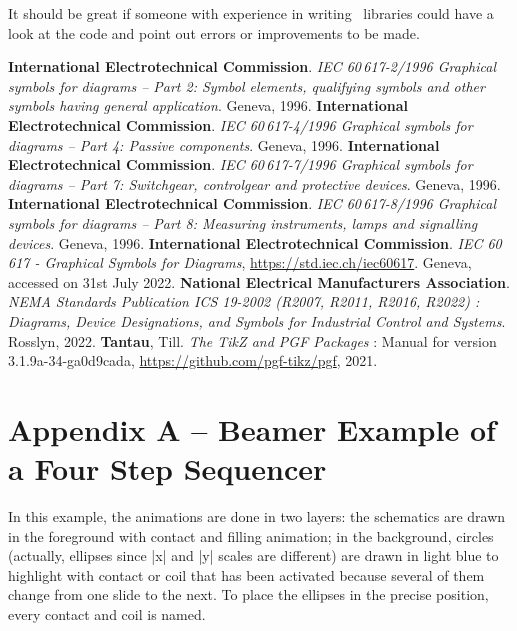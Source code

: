 \documentclass[a4paper]{ltxdoc}
\begin{document}
It should be great if someone with experience in writing \tikzname\ libraries could have a look at the code and point out errors or improvements to be made. 



\begin{thebibliography}{1}

\textbf{International Electrotechnical Commission}. \textit{IEC 60\,617-2/1996 Graphical symbols for diagrams -- Part 2: Symbol elements, qualifying symbols and other symbols having general application}. Geneva, 1996.
\textbf{International Electrotechnical Commission}. \textit{IEC 60\,617-4/1996 Graphical symbols for diagrams -- Part 4: Passive components}. Geneva, 1996.
\textbf{International Electrotechnical Commission}. \textit{IEC 60\,617-7/1996 Graphical symbols for diagrams -- Part 7: Switchgear, controlgear and protective devices}. Geneva, 1996.
\textbf{International Electrotechnical Commission}. \textit{IEC 60\,617-8/1996 Graphical symbols for diagrams -- Part 8: Measuring instruments, lamps and signalling devices}. Geneva, 1996.
\textbf{International Electrotechnical Commission}. \textit{IEC 60\,617 - Graphical Symbols for Diagrams}, \url{https://std.iec.ch/iec60617}. Geneva, accessed on 31st July 2022.
\textbf{National Electrical Manufacturers Association}. \textit{NEMA Standards Publication ICS 19-2002 (R2007, R2011, R2016, R2022) : Diagrams, Device Designations, and Symbols for Industrial Control and Systems}.  Rosslyn, 2022.
\textbf{Tantau}, Till. \textit{The TikZ and PGF Packages} : Manual for version 3.1.9a-34-ga0d9cada, \url{https://github.com/pgf-tikz/pgf}, 2021.

\end{thebibliography}

\appendix
{}
\section*{Appendix A -- Beamer Example of a Four Step Sequencer}

In this example, the animations are done in two layers: the schematics are drawn in the foreground with contact and filling animation; in the background, circles (actually, ellipses since |x| and |y| scales are different) are drawn in light blue to highlight with contact or coil that has been activated because several of them change from one slide to the next. To place the ellipses in the precise position, every contact and coil is named.
\end{document}
